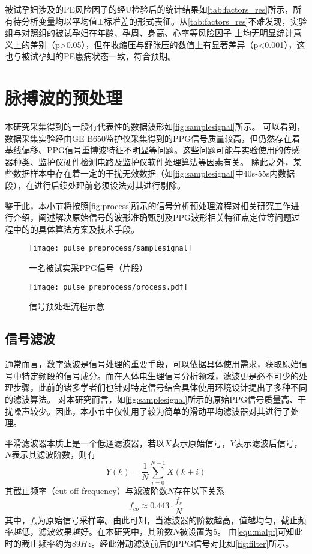 被试孕妇涉及的PE风险因子的经U检验后的统计结果如\autoref{tab:factors_res}所示，所有待分析变量均以平均值±标准差的形式表征。从\autoref{tab:factors_res}不难发现，实验组与对照组的被试孕妇在年龄、孕周、身高、心率等风险因子
上均无明显统计意义上的差别（p>0.05），但在收缩压与舒张压的数值上有显著差异（p<0.001），这也与被试孕妇的PE患病状态一致，符合预期。

\section{脉搏波的预处理}
本研究采集得到的一段有代表性的数据波形如\autoref{fig:samplesignal}所示。
可以看到，数据采集实验经由GE B650监护仪采集得到的PPG信号质量较高，但仍然存在着基线偏移、PPG信号重博波特征不明显等问题。这些问题可能与实验使用的传感器种类、监护仪硬件检测电路及监护仪软件处理算法等因素有关。
除此之外，某些数据样本中存在着一定的干扰无效数据（如\autoref{fig:samplesignal}中40s-55s内数据段），在进行后续处理前必须设法对其进行剔除。

鉴于此，本小节将按照\autoref{fig:process}所示的信号分析预处理流程对相关研究工作进行介绍，阐述解决原始信号的波形准确甄别及PPG波形相关特征点定位等问题过程中的的具体算法方案及技术手段。
\begin{figure}[htbp]
    \centering
    \texttt{[image: pulse\_preprocess/samplesignal]}
    \caption{\label{fig:samplesignal}一名被试实采PPG信号（片段）}
\end{figure}
\begin{figure}[htbp]
    \centering
    \texttt{[image: pulse\_preprocess/process.pdf]}
    \caption{\label{fig:process}信号预处理流程示意}
\end{figure}

\subsection{信号滤波}
通常而言，数字滤波是信号处理的重要手段，可以依据具体使用需求，获取原始信号中特定频段的信号成分。而在人体电生理信号分析领域，滤波更是必不可少的处理步骤，此前的诸多学者们也针对特定信号结合具体使用环境设计提出了多种不同的滤波算法。
对本研究而言，如\autoref{fig:samplesignal}所示的原始PPG信号质量高、干扰噪声较少。因此，本小节中仅使用了较为简单的滑动平均滤波器对其进行了处理。

平滑滤波器本质上是一个低通滤波器，若以$X$表示原始信号，$Y$表示滤波后信号，$N$表示其滤波阶数，则有
\begin{equation}
    \label{equ:filter}
    Y(k)=\frac{1}{N}\sum_{i=0}^{N-1}X(k+i)
\end{equation}
其截止频率（cut-off frequency）与滤波阶数$N$存在以下关系\cite{malp2011,malp2022}
\begin{equation}
    \label{equ:malpf}
    f_{co} \approx 0.443 \cdot \frac{f_s}{N}    
\end{equation}
其中，$f_s$为原始信号采样率。由此可知，当滤波器的阶数越高，值越均匀，截止频率越低，滤波效果越好。在本研究中，其阶数$N$被设置为5。
由\autoref{equ:malpf}可知此时的截止频率约为89$Hz$。经此滑动滤波前后的PPG信号对比如\autoref{fig:filter}所示。

